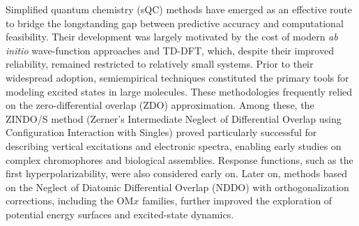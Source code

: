 \documentclass[%
 aip,
 amsmath,amssymb,
preprint,%
]{revtex4-2}
\begin{document}
Simplified quantum chemistry (sQC) methods have emerged as an effective route to bridge the longstanding gap between predictive accuracy and computational feasibility.\cite{bannwarthExtendedTightbindingQuantum2021,loffelsenderSimplifiedQuantumChemistry2024}
Their development was largely motivated by the cost of modern \textit{ab initio} wave-function approaches and TD-DFT, which, despite their improved reliability, remained restricted to relatively small systems.  
Prior to their widespread adoption, semiempirical techniques constituted the primary tools for modeling excited states in large molecules.\cite{thielSemiempiricalQuantumChemical2014,loffelsenderSimplifiedQuantumChemistry2024}
These methodologies frequently relied on the zero-differential overlap (ZDO) approximation.
Among these, the ZINDO/S method\cite{ridleyIntermediateNeglectDifferential1973,zernerSemiempiricalMolecularOrbital1991} (Zerner's Intermediate Neglect of Differential Overlap using Configuration Interaction with Singles) proved particularly successful for describing vertical excitations and electronic spectra, enabling early studies on complex chromophores and biological assemblies.  
Response functions, such as the first hyperpolarizability, were also considered early on.\cite{lalamaOriginNonlinearSecondorder1979,papadopoulosCalculationsInducedMoments1982,waiteCalculationsInducedMoments1982,nicolaidesCalculationsInducedMoments1982,tengDispersionNonlinearSecondorder1983,dochertyCalculationSecondorderElectronic1985,morleyNonlinearOpticalProperties1987}
Later on, methods based on the Neglect of Diatomic Differential Overlap\cite{dewarGroundStatesMolecules1977,dewarDevelopmentUseQuantum1985} (NDDO) with orthogonalization corrections, including the OM$x$ families,\cite{kolbMNDOModelMethodical1993} further improved the exploration of potential energy surfaces and excited-state dynamics.  
\cite{nenonSCCDFTBCalculationStatic2013,nenonOriginSurfaceInducedFirst2014}
\end{document}
